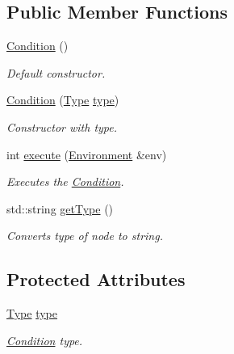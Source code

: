 \subsection*{Public Member Functions}
\begin{DoxyCompactItemize}
\item 
\hypertarget{classCondition_af11513db4fcbde93961fa0b65e7ab764}{}\hyperlink{classCondition_af11513db4fcbde93961fa0b65e7ab764}{Condition} ()\label{classCondition_af11513db4fcbde93961fa0b65e7ab764}

\begin{DoxyCompactList}\small\item\em Default constructor. \end{DoxyCompactList}\item 
\hyperlink{classCondition_adffecd1d1fac2e3e75e190c63b409dd1}{Condition} (\hyperlink{classCondition_a3eed4b7ef94da5dda4a3353cffa8266e}{Type} \hyperlink{classCondition_aeebc812b5f02a5e017c26d4573e85530}{type})
\begin{DoxyCompactList}\small\item\em Constructor with type. \end{DoxyCompactList}\item 
int \hyperlink{classCondition_a59fde5772e9f804f86001c04cfce39ce}{execute} (\hyperlink{classEnvironment}{Environment} \&env)
\begin{DoxyCompactList}\small\item\em Executes the \hyperlink{classCondition}{Condition}. \end{DoxyCompactList}\item 
std\+::string \hyperlink{classCondition_addf79a820326e04e58937c9875afe181}{get\+Type} ()
\begin{DoxyCompactList}\small\item\em Converts type of node to string. \end{DoxyCompactList}\end{DoxyCompactItemize}
\subsection*{Protected Attributes}
\begin{DoxyCompactItemize}
\item 
\hypertarget{classCondition_aeebc812b5f02a5e017c26d4573e85530}{}\hyperlink{classCondition_a3eed4b7ef94da5dda4a3353cffa8266e}{Type} \hyperlink{classCondition_aeebc812b5f02a5e017c26d4573e85530}{type}\label{classCondition_aeebc812b5f02a5e017c26d4573e85530}

\begin{DoxyCompactList}\small\item\em \hyperlink{classCondition}{Condition} type. \end{DoxyCompactList}\end{DoxyCompactItemize}


